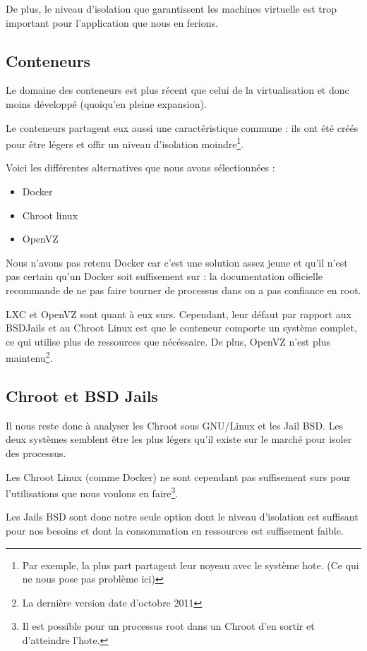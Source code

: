 \documentclass[10pt,a4paper]{article}
\begin{document}
De plus, le niveau d'isolation que garantissent les machines virtuelle est trop important pour l'application que nous en ferions.

\subsection{Conteneurs}
Le domaine des conteneurs est plus récent que celui de la virtualisation et donc moins développé (quoiqu'en pleine expansion).

Le conteneurs partagent eux aussi une caractéristique commune : ils ont été créés pour être légers et offir un niveau d'isolation moindre\footnote{Par exemple, la plus part partagent leur noyeau avec le système hote. (Ce qui ne nous pose pas problème ici)}.

Voici les différentes alternatives que nous avons sélectionnées :

\begin{itemize}
    \item{Docker}
    \item{Chroot linux}
    \item{OpenVZ}
\end{itemize}

Nous n'avons pas retenu Docker car c'est une solution assez jeune et qu'il n'est pas certain qu'un Docker soit suffisement sur : la documentation officielle recommande de ne pas faire tourner de processus dans on a pas confiance en root.

LXC et OpenVZ sont quant à eux surs.
Cependant, leur défaut par rapport aux BSDJails et au Chroot Linux est que le conteneur comporte un système complet, ce qui utilise plus de ressources que nécéssaire.
De plus, OpenVZ n'est plus maintenu\footnote{La dernière version date d'octobre 2011}.

\subsection{Chroot et BSD Jails}

Il nous reste donc à analyser les Chroot sous GNU/Linux et les Jail BSD.
Les deux systèmes semblent être les plus légers qu'il existe sur le marché pour isoler des processus.


Les Chroot Linux (comme Docker) ne sont cependant pas suffisement surs pour l'utilisations que nous voulons en faire\footnote{Il est possible pour un processus root dans un Chroot d'en sortir et d'atteindre l'hote.}.

Les Jails BSD sont donc notre seule option dont le niveau d'isolation est suffisant pour nos besoins et dont la consommation en ressources est suffisement faible.
\end{document}
